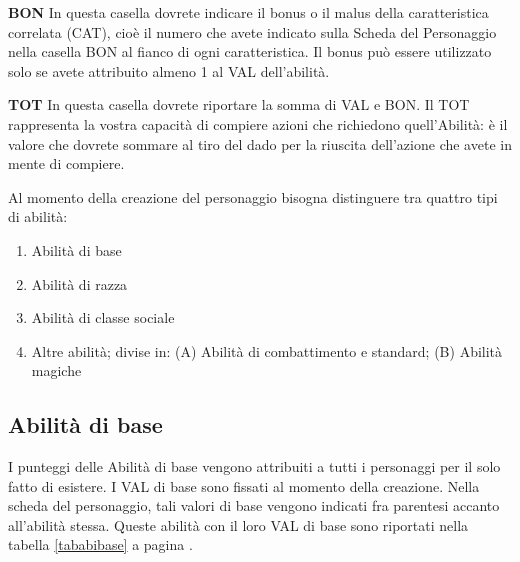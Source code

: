 \begin{description}
\item{\bf BON} In questa casella dovrete indicare il bonus o il
  malus della caratteristica correlata (CAT), cio\`e il numero che
  avete indicato sulla Scheda del Personaggio nella casella BON al
  fianco di ogni caratteristica.  Il bonus pu\`o essere utilizzato
  solo se avete attribuito almeno 1 al VAL dell'abilit\`a.
  
\item{\bf TOT} In questa casella dovrete riportare la somma di VAL e
  BON. Il TOT rappresenta la vostra capacit\`a di compiere azioni che
  richiedono quell'Abilit\`a:  \`e il valore che dovrete sommare al
  tiro del dado per la riuscita dell'azione che avete in mente di
  compiere.

\end{description}

Al momento della creazione del personaggio bisogna distinguere tra
quattro tipi di abilit\`a:

\begin{enumerate}
  \itemsep -6pt
\item Abilit\`a di base
\item Abilit\`a di razza
\item Abilit\`a di classe sociale
\item Altre abilit\`a; divise in: (A) Abilit\`a di combattimento e
  standard; (B) Abilit\`a magiche
\end{enumerate}


\subsection{Abilit\`a di base}

I punteggi delle Abilit\`a di base vengono attribuiti a tutti i
personaggi per il solo fatto di esistere. I VAL di base sono fissati
al momento della creazione.  Nella scheda del personaggio, tali valori
di base vengono indicati fra parentesi accanto all'abilit\`a stessa.
Queste abilit\`a con il loro VAL di base sono riportati nella
tabella \ref{tababibase} a pagina \pageref{tababibase}.

